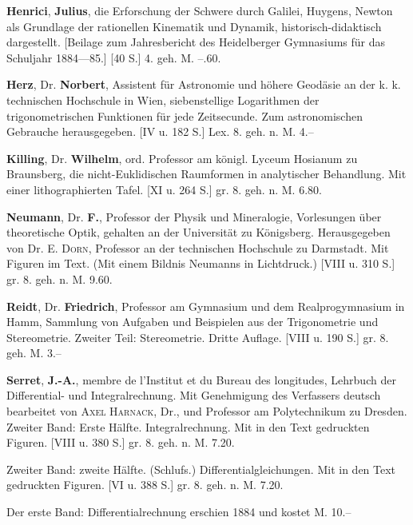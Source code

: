 \documentclass[11pt]{article}
\begin{document}
\textbf{Henrici}, \textbf{Julius}, die Erforschung der Schwere durch Galilei, Huygens, Newton als Grundlage der rationellen Kinematik und Dynamik, historisch-didaktisch dargestellt. [Beilage zum Jahresbericht des Heidelberger Gymnasiums f\"ur das Schuljahr 1884---85.] [40 S.] 4. geh. M. --.60.

\textbf{Herz}, Dr. \textbf{Norbert}, Assistent f\"ur Astronomie und h\"ohere Geod\"asie an der k. k. technischen Hochschule in Wien, siebenstellige Logarithmen der trigonometrischen Funktionen f\"ur jede Zeitsecunde. Zum astronomischen Gebrauche herausgegeben. [IV u. 182 S.] Lex. 8. geh. n. M. 4.--

\textbf{Killing}, Dr. \textbf{Wilhelm}, ord. Professor am k\"onigl. Lyceum Hosianum zu Braunsberg, die nicht-Euklidischen Raumformen in analytischer Behandlung. Mit einer lithographierten Tafel. [XI u. 264 S.] gr. 8. geh. n. M. 6.80.



\textbf{Neumann}, Dr. \textbf{F.}, Professor der Physik und Mineralogie, Vorlesungen \"uber theoretische Optik, gehalten an der Universit\"at zu K\"onigsberg. Herausgegeben von Dr. E. \textsc{Dorn}, Professor an der technischen Hochschule zu Darmstadt. Mit Figuren im Text. (Mit einem Bildnis Neumanns in Lichtdruck.) [VIII u. 310 S.] gr. 8. geh. n. M. 9.60.

\textbf{Reidt}, Dr. \textbf{Friedrich}, Professor am Gymnasium und dem Realprogymnasium in Hamm, Sammlung von Aufgaben und Beispielen aus der Trigonometrie und Stereometrie. Zweiter Teil: Stereometrie. Dritte Auflage. [VIII u. 190 S.] gr. 8. geh. M. 3.--

\textbf{Serret}, \textbf{J.-A.}, membre de l'Institut et du Bureau des longitudes, Lehrbuch der Differential- und Integralrechnung. Mit Genehmigung des Verfassers deutsch bearbeitet von \textsc{Axel Harnack}, Dr., und Professor am Polytechnikum zu Dresden. Zweiter Band: Erste H\"alfte. Integralrechnung. Mit in den Text gedruckten Figuren. [VIII u. 380 S.] gr. 8. geh. \hfill n. M. 7.20.

\textemdash{} \textemdash{} Zweiter Band: zweite H\"alfte. (Schlufs.) Differentialgleichungen. Mit in den Text gedruckten Figuren. [VI u. 388 S.] gr. 8. geh. \hfill n. M. 7.20.

Der erste Band: Differentialrechnung erschien 1884 und kostet M. 10.--
\end{document}
